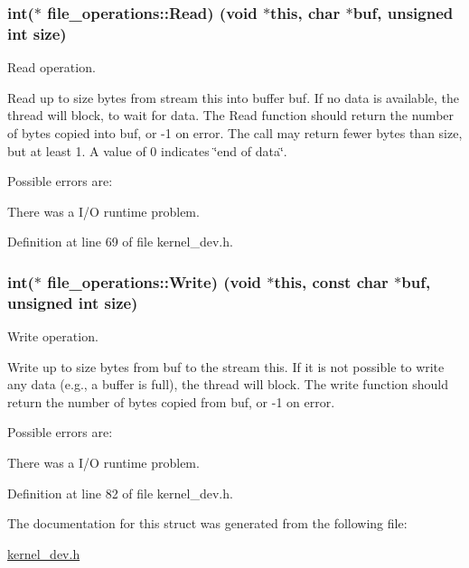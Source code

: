\subsubsection[{\texorpdfstring{Read}{Read}}]{\setlength{\rightskip}{0pt plus 5cm}int($\ast$ file\+\_\+operations\+::\+Read) (void $\ast$this, char $\ast$buf, unsigned int size)}\hypertarget{structfile__operations_a59d973a490a6861c498ac9cc9c32dbf5}{}\label{structfile__operations_a59d973a490a6861c498ac9cc9c32dbf5}


Read operation. 

Read up to \textquotesingle{}size\textquotesingle{} bytes from stream \textquotesingle{}this\textquotesingle{} into buffer \textquotesingle{}buf\textquotesingle{}. If no data is available, the thread will block, to wait for data. The Read function should return the number of bytes copied into buf, or -\/1 on error. The call may return fewer bytes than \textquotesingle{}size\textquotesingle{}, but at least 1. A value of 0 indicates \char`\"{}end of data\char`\"{}.

Possible errors are\+:
\begin{DoxyItemize}
\item There was a I/O runtime problem. 
\end{DoxyItemize}

Definition at line 69 of file kernel\+\_\+dev.\+h.

\subsubsection[{\texorpdfstring{Write}{Write}}]{\setlength{\rightskip}{0pt plus 5cm}int($\ast$ file\+\_\+operations\+::\+Write) (void $\ast$this, const char $\ast$buf, unsigned int size)}\hypertarget{structfile__operations_a75d4020e8a146c1611dc40184d211ec6}{}\label{structfile__operations_a75d4020e8a146c1611dc40184d211ec6}


Write operation. 

Write up to \textquotesingle{}size\textquotesingle{} bytes from \textquotesingle{}buf\textquotesingle{} to the stream \textquotesingle{}this\textquotesingle{}. If it is not possible to write any data (e.\+g., a buffer is full), the thread will block. The write function should return the number of bytes copied from buf, or -\/1 on error.

Possible errors are\+:
\begin{DoxyItemize}
\item There was a I/O runtime problem. 
\end{DoxyItemize}

Definition at line 82 of file kernel\+\_\+dev.\+h.



The documentation for this struct was generated from the following file\+:\begin{DoxyCompactItemize}
\item 
\hyperlink{kernel__dev_8h}{kernel\+\_\+dev.\+h}\end{DoxyCompactItemize}
